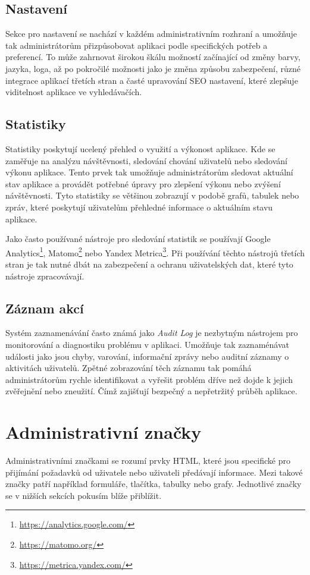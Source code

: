 \subsection{Nastavení}
\label{subsec:admin-elements-settings}
Sekce pro nastavení se nachází v každém administrativním rozhraní a umožňuje tak administrátorům přizpůsobovat aplikaci podle specifických potřeb a preferencí. To může zahrnovat širokou škálu možností začínající od změny barvy, jazyka, loga, až po pokročilé možnosti jako je změna způsobu zabezpečení, různé integrace aplikací třetích stran a časté upravování SEO nastavení, které zlepšuje viditelnost aplikace ve vyhledávačích.

\subsection{Statistiky}
\label{subsec:admin-elements-statistics}
Statistiky poskytují ucelený přehled o využití a výkonost aplikace. Kde se zaměřuje na analýzu návštěvnosti, sledování chování uživatelů nebo sledování výkonu aplikace. Tento prvek tak umožňuje administrátorům sledovat aktuální stav aplikace a provádět potřebné úpravy pro zlepšení výkonu nebo zvýšení návštěvnosti.
Tyto statistiky se většinou zobrazují v podobě grafů, tabulek nebo zpráv, které poskytují uživatelům přehledné informace o aktuálním stavu aplikace.

Jako často používané nástroje pro sledování statistik se používají Google Analytics\footnote[4]{\url{https://analytics.google.com/}}, Matomo\footnote[5]{\url{https://matomo.org/}} nebo Yandex Metrica\footnote[6]{\url{https://metrica.yandex.com/}}. Při používání těchto nástrojů třetích stran je tak nutné dbát na zabezpečení a ochranu uživatelských dat, které tyto nástroje zpracovávají.

\subsection{Záznam akcí}
\label{subsec:admin-elements-logs}
Systém zaznamenávání často známá jako \textit{Audit Log} je nezbytným nástrojem pro monitorování a diagnostiku problému v aplikaci. Umožňuje tak zaznaménávat události jako jsou chyby, varování, informační zprávy nebo auditní záznamy o aktivitách uživatelů. Zpětné zobrazování těch záznamu tak pomáhá administrátorům rychle identifikovat a vyřešit problém dříve než dojde k jejich zvěřejnění nebo zneužití. Čímž zajišťují bezpečný a nepřetržitý průběh aplikace.

\section{Administrativní značky}
\label{sec:admin-tags}
Administrativními značkami se rozumí prvky HTML, které jsou specifické pro přijímání požadavků od uživatele nebo uživateli předávají informace. Mezi takové značky patří například formuláře, tlačítka, tabulky nebo grafy. Jednotlivé značky se v nižších sekcích pokusím blíže přiblížit.

